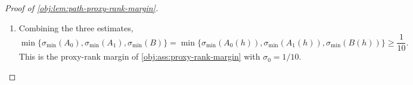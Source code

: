 \begin{proof}[Proof of \cref{obj:lem:path-proxy-rank-margin}]
\begin{enumerate}
\item Combining the three estimates,
\[
\min\{\sigma_{\min}(A_0),\sigma_{\min}(A_1),\sigma_{\min}(B)\}
=
\min\{\sigma_{\min}(A_0(h)),\sigma_{\min}(A_1(h)),\sigma_{\min}(B(h))\}
\ge \frac1{10}.
\]
This is the proxy-rank margin of \cref{obj:ass:proxy-rank-margin} with \(\sigma_0=1/10\). %
\end{enumerate}
\end{proof}
